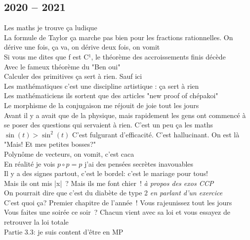 \documentclass[french, a4paper, openany]{book}
\begin{document}
	\subsection*{2020 -- 2021}
		\noindent \og Les maths je trouve ça ludique \fg \\
		\og La formule de Taylor ça marche pas bien pour les fractions rationnelles. On dérive une fois, ça va, on dérive deux fois, on vomit \fg \\
		\og Si vous me dites que f est C¹, le théorème des accroissements finis décède \fg \\
		\og Avec le fameux théorème du "Ben oui" \fg \\
		\og Calculer des primitives ça sert à rien. Sauf ici \fg \\
		\og Les mathématiques c'est une discipline artistique : ça sert à rien \fg \\
		\og Les mathématiciens ils sortent que des articles "new proof of chépakoi" \fg \\
		\og Le morphisme de la conjugaison me réjouit de joie tout les jours \fg \\
		\og Avant il y a avait que de la physique, mais rapidement les gens ont commencé à se poser des questions qui servaient à rien. C'est un peu ça les maths \fg \\
		$\sin(t) > \sin^2(t)$ \og C'est fulgurant d'efficacité. C'est hallucinant. On est là "Mais! Et mes petites bosses?" \fg \\
		\og Polynôme de vecteurs, on vomit, c'est caca \fg \\
		\og En réalité je vois $p \circ p = p$ j'ai des pensées secrètes inavouables \fg \\
		\og Il y a des signes partout, c'est le bordel: c'est le mariage pour tous! \fg \\
		\og Mais ils ont mis |x|~? Mais ils me font chier~! \fg \emph{à propos des exos CCP} \\
		\og On pourrait dire que c'est du diabète de type 2 \fg \emph{en parlant d'un exercice} \\
		\og C'est quoi ça? Premier chapitre de l'année~! Vous rajeunissez tout les jours \fg \\
		\og Vous faites une soirée ce soir~? Chacun vient avec sa loi et vous essayez de retrouver la loi totale \fg \\
		\og Partie 3.3: je suis content d'être en MP \fg \\
\end{document}
